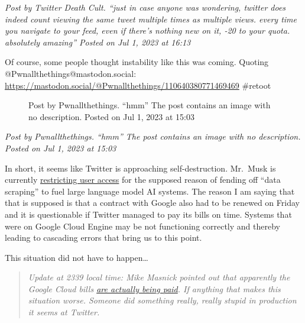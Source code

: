 \emph{Post by Twitter Death Cult. ``just in case anyone was wondering,
twitter does indeed count viewing the same tweet multiple times as
multiple views. every time you navigate to your feed, even if there's
nothing new on it, -20 to your quota. absolutely amazing'' Posted on Jul
1, 2023 at 16:13}

Of course, some people thought instability like this was coming. Quoting
@Pwnallthethings@mastodon.social:
\url{https://mastodon.social/@Pwnallthethings/110640380771469469}
\#retoot

\begin{figure}
\centering
{}
\caption{Post by Pwnallthethings. ``hmm'' The post contains an image
with no description. Posted on Jul 1, 2023 at 15:03}
\end{figure}

\emph{Post by Pwnallthethings. ``hmm'' The post contains an image with
no description. Posted on Jul 1, 2023 at 15:03}

In short, it seems like Twitter is approaching self-destruction.
Mr.~Musk is currently
\href{https://variety.com/2023/digital/news/twitter-not-loading-elon-musk-announces-limits-posts-users-can-read-1235659936/}{restricting
user access} for the supposed reason of fending off ``data scraping'' to
fuel large language model AI systems. The reason I am saying that that
is supposed is that a contract with Google also had to be renewed on
Friday and it is questionable if Twitter managed to pay its bills on
time. Systems that were on Google Cloud Engine may be not functioning
correctly and thereby leading to cascading errors that bring us to this
point.

This situation did not have to happen\ldots{}

\begin{quote}
\emph{Update at 2339 local time: Mike Masnick pointed out that
apparently the Google Cloud bills
\href{https://ubuntu.social/@mmasnick@mastodon.social/110641215957360817}{are
actually being paid}. If anything that makes this situation worse.
Someone did something really, really stupid in production it seems at
Twitter.}
\end{quote}
